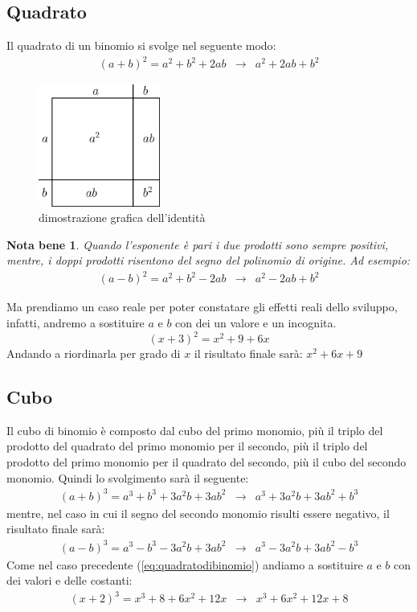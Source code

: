 \documentclass{article}
\newtheorem{notab}{Nota bene}
\begin{document}
\subsection{Quadrato}
\label{sec:binomiodi2}
Il quadrato di un binomio si svolge nel seguente modo:
\begin{eqnarray}
  \label{eq:quadratodibinomio}
  (a+b)^2=a^2+b^2+2ab & \to & a^2+2ab+b^2
\end{eqnarray}
\begin{figure}[th]
  \centering
  \includegraphics[width=4cm]{img/binomio.eps}
  \caption{dimostrazione grafica dell'identità}
  \label{fig:identità}
\end{figure}
\begin{notab}
  Quando l'esponente è pari i due prodotti sono sempre positivi, mentre, i doppi prodotti risentono del segno
  del polinomio di origine. Ad esempio:
  \begin{eqnarray}
    \label{eq:quadratodibinomioconsegnonegativo}
    (a-b)^2=a^2+b^2-2ab & \to & a^2-2ab+b^2
  \end{eqnarray}
\end{notab}
Ma prendiamo un caso reale per poter constatare gli effetti reali dello sviluppo, infatti, andremo a sostituire
$a$ e $b$ con dei un valore e un incognita.
\begin{equation*}
  (x+3)^2=x^2 + 9 + 6x
\end{equation*}
Andando a riordinarla per grado di $x$ il risultato finale sarà: $x^2+6x + 9$

\subsection{Cubo}
\label{sec:qudodibinomio}

Il cubo di binomio è composto dal cubo del primo monomio, più il triplo del prodotto del quadrato del primo
monomio per il secondo, più il triplo del prodotto del primo monomio per il quadrato del secondo, più il cubo
del secondo monomio. Quindi lo svolgimento sarà il seguente:
\begin{eqnarray}
  \label{eq:cubodibinomio}
  (a+b)^3=a^3+b^3+3a^2b+3ab^2 & \to & a^3+3a^2b+3ab^2+b^3
\end{eqnarray}
mentre, nel caso in cui il segno del secondo monomio risulti essere negativo, il risultato finale sarà:
\begin{eqnarray}
  \label{eq:cubodibinomioneg}
  (a-b)^3=a^3-b^3-3a^2b+3ab^2 & \to & a^3-3a^2b+3ab^2-b^3
\end{eqnarray}
Come nel caso precedente (\ref{eq:quadratodibinomio}) andiamo a sostituire $a$ e $b$ con dei valori e delle
costanti:
\begin{eqnarray*}
  (x+2)^3=x^3+8+6x^2+12x & \to  & x^3+6x^2+12x+8
\end{eqnarray*}
\end{document}
